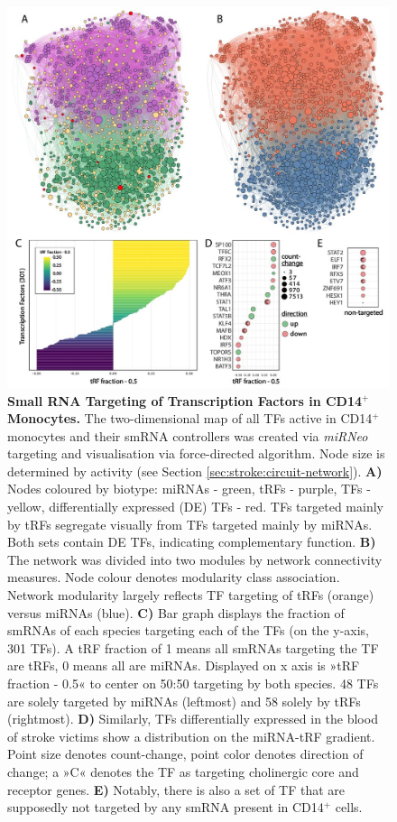 \begin{figure}
\includegraphics[width=\textwidth]{figures/smrna-tf-network-fractions}
\caption[Small RNA Targeting of Transcription Factors in CD14$^+$ Monocytes.]{\textbf{Small RNA Targeting of Transcription Factors in CD14$^+$ Monocytes.} The two-dimensional map of all TFs active in CD14$^+$ monocytes and their smRNA controllers was created via \emph{miRNeo} targeting and visualisation via force-directed algorithm. Node size is determined by activity (see Section \ref{sec:stroke:circuit-network}). \textbf{A)} Nodes coloured by biotype: miRNAs - green, tRFs - purple, TFs - yellow, differentially expressed (DE) TFs - red. TFs targeted mainly by tRFs segregate visually from TFs targeted mainly by miRNAs. Both sets contain DE TFs, indicating complementary function. \textbf{B)} The network was divided into two modules by network connectivity measures. Node colour denotes modularity class association. Network modularity largely reflects TF targeting of tRFs (orange) versus miRNAs (blue). \textbf{C)} Bar graph displays the fraction of smRNAs of each species targeting each of the TFs (on the y-axis, 301 TFs). A tRF fraction of 1 means all smRNAs targeting the TF are tRFs, 0 means all are miRNAs. Displayed on x axis is »tRF fraction - 0.5« to center on 50:50 targeting by both species. 48 TFs are solely targeted by miRNAs (leftmost) and 58 solely by tRFs (rightmost). \textbf{D)} Similarly, TFs differentially expressed in the blood of stroke victims show a distribution on the miRNA-tRF gradient. Point size denotes count-change, point color denotes direction of change; a »C« denotes the TF as targeting cholinergic core and receptor genes. \textbf{E)} Notably, there is also a set of TF that are supposedly not targeted by any smRNA present in CD14$^+$ cells.
\label{fig:smrna-tf-network-fractions}}
\end{figure}

